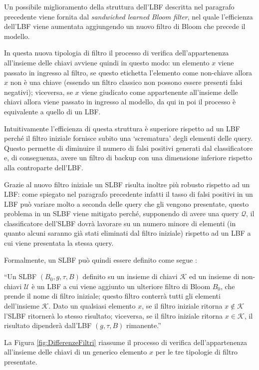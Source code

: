 \documentclass[../../main.tex]{subfiles}
\begin{document}
    Un possibile miglioramento della struttura dell'LBF descritta nel paragrafo precedente viene fornita dal \textit{sandwiched learned Bloom filter}, nel quale l'efficienza dell'LBF viene aumentata aggiungendo un nuovo filtro di Bloom che precede il modello.

    In questa nuova tipologia di filtro il processo di verifica dell'appartenenza all'insieme delle chiavi avviene quindi in questo modo: un elemento $x$ viene passato in ingresso al filtro, se questo etichetta l'elemento come non-chiave allora $x$ non è una chiave (essendo un filtro classico non possono essere presenti falsi negativi); viceversa, se $x$ viene giudicato come appartenente all'insieme delle chiavi allora viene passato in ingresso al modello, da qui in poi il processo è equivalente a quello di un LBF.

    Intuitivamente l'efficienza di questa struttura è superiore rispetto ad un LBF perché il filtro iniziale fornisce subito una `scrematura' degli elementi delle query. Questo permette di diminuire il numero di falsi positivi generati dal classificatore e, di conseguenza, avere un filtro di backup con una dimensione inferiore rispetto alla controparte dell'LBF.

    Grazie al nuovo filtro iniziale un SLBF risulta inoltre più robusto rispetto ad un LBF: come spiegato nel paragrafo precedente infatti il tasso di falsi positivi in un LBF può variare molto a seconda delle query che gli vengono presentate, questo problema in un SLBF viene mitigato perché, supponendo di avere una query $\mathcal{Q}$, il classificatore dell'SLBF dovrà lavorare su un numero minore di elementi (in quanto alcuni saranno già stati eliminati dal filtro iniziale) rispetto ad un LBF a cui viene presentata la stessa query.

    Formalmente, un SLBF può quindi essere definito come segue \cite{ma2020}: 

    ``Un SLBF $(B_0, g, \tau, B)$ definito su un insieme di chiavi $\mathcal{K}$ ed un insieme di non-chiavi $\mathcal{U}$ è un LBF a cui viene aggiunto un ulteriore filtro di Bloom $B_0$, che prende il nome di filtro iniziale; questo filtro conterrà tutti gli elementi dell'insieme $\mathcal{K}$. Dato un qualsiasi elemento $x$, se il filtro iniziale ritorna $x \notin \mathcal{K}$ l'SLBF ritornerà lo stesso risultato; viceversa, se il filtro iniziale ritorna $x \in \mathcal{K}$, il risultato dipenderà dall'LBF $(g, \tau, B)$ rimanente.''

    La Figura \ref{fig:DifferenzeFiltri} riassume il processo di verifica dell'appartenenza all'insieme delle chiavi di un generico elemento $x$ per le tre tipologie di filtro presentate.
    
\end{document}
